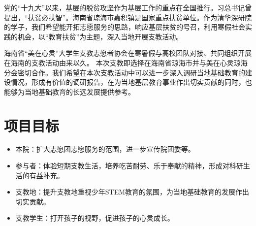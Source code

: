 \documentclass[12pt]{ctexart}
\begin{document}
党的“十九大”以来，基层的脱贫攻坚作为基层工作的重点在全国推行。习总书记曾提出，“扶贫必扶智”。海南省琼海市嘉积镇是国家重点扶贫单位。作为清华深研院的学子，我们希望能开拓志愿服务的思路，响应基层扶贫的号召，利用寒假社会实践的机会，以“教育扶贫”为主题，深入当地开展支教活动。

海南省“美在心灵”大学生支教志愿者协会在寒暑假与高校团队对接、共同组织开展在海南的支教活动由来以久。
本次支教即选择在海南省琼海市并与美在心灵琼海分会密切合作。我们希望在本次支教活动中可以进一步深入调研当地基础教育的建设情况，形成有价值的调研报告，在为当地基层教育事业作出切实贡献的同时，也能够为当地基础教育的长远发展提供参考。

\section{项目目标}
\begin{itemize}
\item 本院：扩大志愿团志愿服务的范围，进一步宣传院团委等。
\item 参与者：体验短期支教生活，培养吃苦耐劳、乐于奉献的精神，形成对科研生活的有益补充。
\item 支教地：提升支教地重视少年STEM教育的氛围，为当地基础教育的发展作出切实贡献。
\item 支教学生：打开孩子的视野，促进孩子的心灵成长。
\end{itemize}
\end{document}
